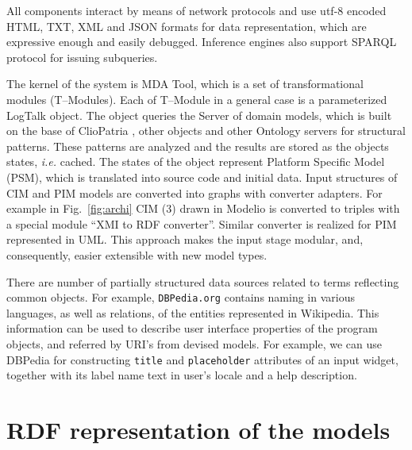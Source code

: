 \documentclass[conference]{IEEEtran}
\begin{document}
All components interact by means of network protocols and use utf-8 encoded HTML, TXT, XML and JSON formats for data representation, which are expressive enough and easily debugged.  Inference engines also support SPARQL protocol for issuing subqueries.

The kernel of the system is MDA Tool, which is a set of transformational modules (T--Modules). Each of T--Module in a general case is a parameterized LogTalk object.  The object queries the Server of domain models, which is built on the base of ClioPatria \cite{Clio}, other objects and other Ontology servers for structural patterns.  These patterns are analyzed and the results are stored as the objects states, \emph{i.e.} cached.  The states of the object represent Platform Specific Model (PSM), which is translated into source code and initial data.  Input structures of CIM and PIM models are converted into graphs with converter adapters.  For example in Fig.~\ref{fig:archi} CIM (3) drawn in Modelio \cite{modelio} is converted to triples with a special module ``XMI to RDF converter''.  Similar converter is realized for PIM represented in UML.  This approach makes the input stage modular, and, consequently, easier extensible with new model types.


There are number of partially structured data sources related to terms reflecting common objects.  For example, \texttt{DBPedia.org} contains naming in various languages, as well as relations, of the entities represented in Wikipedia.  This information can be used to describe user interface properties of the program objects, and referred by URI's from devised models.  For example, we can use DBPedia for constructing \texttt{title} and \texttt{placeholder} attributes of an input widget, together with its label name text in user's locale and a help description.


\section{RDF representation of the models}
\label{sec:rdf-repr}
\end{document}
